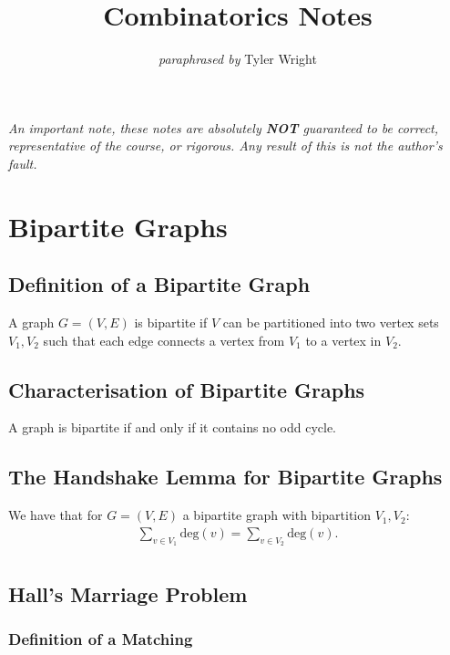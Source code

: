 \documentclass[a4paper, 12pt, twoside]{article}
\begin{document}
\title{Combinatorics Notes}
\date{}
\author{\textit{paraphrased by} Tyler Wright}
\maketitle

\vfill

\textit{An important note, these notes are absolutely \textbf{NOT}
  guaranteed to be correct, representative of the course, or rigorous.
  Any result of this is not the author's fault.}

\newpage

\section{Bipartite Graphs}

\subsection{Definition of a Bipartite Graph}

A graph $G = (V, E)$ is bipartite if $V$ can be partitioned into
two vertex sets $V_1, V_2$ such that each edge connects a vertex
from $V_1$ to a vertex in $V_2$.

\subsection{Characterisation of Bipartite Graphs}

A graph is bipartite if and only if it contains no odd cycle.

\subsection{The Handshake Lemma for Bipartite Graphs}

We have that for $G = (V, E)$ a bipartite graph with bipartition
$V_1, V_2$: \begin{gather*}
  \sum_{v \in V_1} \text{deg}(v) = \sum_{v \in V_2} \text{deg}(v). \\
\end{gather*}

\subsection{Hall's Marriage Problem}

\subsubsection{Definition of a Matching}
\end{document}

